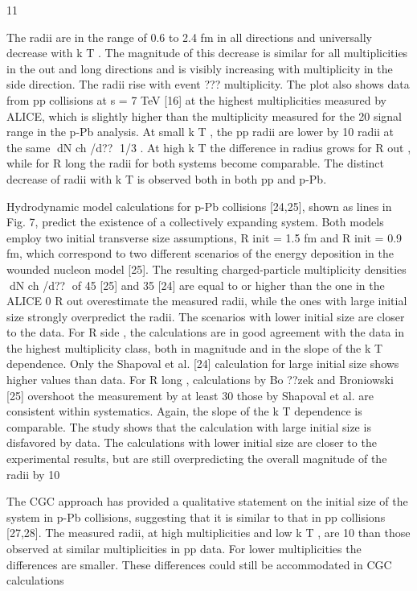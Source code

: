 11

The radii are in the range of 0.6 to 2.4 fm in all
directions and universally decrease with k T . The magnitude of
this decrease is similar for all multiplicities in the out and long
directions and is visibly increasing with multiplicity in the
side direction. The radii rise with event
??? multiplicity. The plot
also shows data from pp collisions at s = 7 TeV [16] at the
highest multiplicities measured by ALICE, which is slightly
higher than the multiplicity measured for the 20%
signal range in the p-Pb analysis. At small k T , the pp radii
are lower by 10%
radii at the same dN ch /d?? 1/3 . At high k T the difference in
radius grows for R out , while for R long the radii for both systems
become comparable. The distinct decrease of radii with k T is
observed both in both pp and p-Pb.

Hydrodynamic model calculations for p-Pb collisions
[24,25], shown as lines in Fig. 7, predict the existence of
a collectively expanding system. Both models employ two
initial transverse size assumptions, R init = 1.5 fm and R init =
0.9 fm, which correspond to two different scenarios of the
energy deposition in the wounded nucleon model [25]. The
resulting charged-particle multiplicity densities dN ch /d?? of
45 [25] and 35 [24] are equal to or higher than the one in
the ALICE 0%
R out overestimate the measured radii, while the ones with
large initial size strongly overpredict the radii. The scenarios
with lower initial size are closer to the data. For R side , the
calculations are in good agreement with the data in the highest
multiplicity class, both in magnitude and in the slope of the
k T dependence. Only the Shapoval et al. [24] calculation for
large initial size shows higher values than data. For R long ,
calculations by Bo ??zek and Broniowski [25] overshoot the
measurement by at least 30%
those by Shapoval et al. are consistent within systematics.
Again, the slope of the k T dependence is comparable. The study
shows that the calculation with large initial size is disfavored
by data. The calculations with lower initial size are closer to
the experimental results, but are still overpredicting the overall
magnitude of the radii by 10%

The CGC approach has provided a qualitative statement on
the initial size of the system in p-Pb collisions, suggesting
that it is similar to that in pp collisions [27,28]. The measured
radii, at high multiplicities and low k T , are 10%
than those observed at similar multiplicities in pp data.
For lower multiplicities the differences are smaller. These
differences could still be accommodated in CGC calculations

